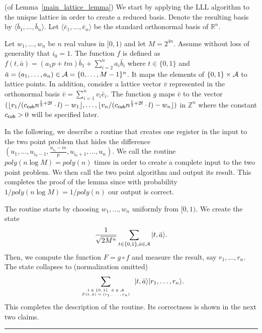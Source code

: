 \documentclass[11pt]{article}
\newcommand{\qedsymb}{\hfill{\rule{2mm}{2mm}}}
\newenvironment{proof}{\begin{trivlist}
\item[\hspace{\labelsep}{\sl\noindent Proof:\/}]
}{\qedsymb\end{trivlist}}
\def\Z{\mathbb{Z}}
\def\R{\mathbb{R}}
\def\half{{\frac{1}{2}}}
\newcommand\ontop[2]{{
\tiny\begin{array}{c} {#1} \\ {#2} \end{array} }}
\newcommand\ket[1]{{ |{#1} \rangle }}
\newcommand\C[1]{{ c_{\sf {#1}} }}
\begin{document}
\begin{proof}(of Lemma~\ref{main_lattice_lemma})
We start by applying the LLL algorithm to the unique lattice in order to create a reduced basis. Denote the resulting
basis by $\langle \bar{b}_1,\ldots,\bar{b}_n \rangle$. Let $\langle \bar{e}_1,\ldots,\bar{e}_n \rangle$ be the standard
orthonormal basis of $\R^n$.

Let $w_1,\ldots,w_n$ be $n$ real values in $[0,1)$ and let $M=2^{4n}$. Assume without loss of generality that $i_0=1$.
The function $f$ is defined as $f(t,\bar{a})=(a_1 p + t m) \bar{b}_1 + \sum_{i=2}^n {a_i \bar{b}_i}$ where $t\in
\{0,1\}$ and $\bar{a}=(a_1,\ldots,a_n) \in {\cal A} = \{0,\ldots,M-1\}^n$. It maps the elements of $\{0,1\}\times {\cal
A}$ to lattice points. In addition, consider a lattice vector $\bar{v}$ represented in the orthonormal basis $\bar{v} =
\sum_{i=1}^n v_i \bar{e}_i$. The function $g$ maps $\bar{v}$ to the vector $(\lfloor v_1/(\C{cub} n^{\half+2{\sf f}}
\cdot l)-w_1 \rfloor , \ldots , \lfloor v_n/(\C{cub} n^{\half+2{\sf f}} \cdot l) - w_n \rfloor)$ in $\Z^n$ where the
constant $\C{cub}>0$ will be specified later.

In the following, we describe a routine that creates one register in the input to the two point problem that hides the
difference $(u_1,\ldots,u_{i_0-1},\frac{u_{i_0}-m}{p},u_{i_0+1},\ldots,u_n)$. We call the routine $poly(n\log
M)=poly(n)$ times in order to create a complete input to the two point problem. We then call the two point algorithm
and output its result. This completes the proof of the lemma since with probability $1/poly(n\log M)=1/poly(n)$ our
output is correct.

The routine starts by choosing $w_1,\ldots, w_n$ uniformly from $[0,1)$. We create the state
 $$ \frac{1}{\sqrt{2M^n}}\sum_{t\in \{0,1\}, \bar{a} \in {\cal A}} \ket{t,\bar{a}}. $$
Then, we compute the function $F=g\circ f$ and measure the result, say $r_1,\ldots,r_n$. The state collapses to
(normalization omitted)
 $$\sum_{\ontop{t\in\{0,1\}~~\bar{a} \in {\cal A}}{F(t,\bar{a}) = (r_1,\ldots,r_n) }} \ket{t,\bar{a}} \ket{r_1,\ldots,r_n}. $$
This completes the description of the routine. Its correctness is shown in the next two claims.


\end{proof}
\end{document}
